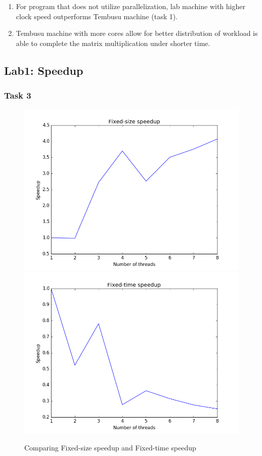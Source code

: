 \documentclass[12pt]{article}
\begin{document}
  \begin{enumerate}
    \item For program that does not utilize parallelization, lab machine
      with higher clock speed outperforms Tembusu machine (task 1).
    \item Tembusu machine with more cores allow for better distribution
      of workload is able to complete the matrix multiplication under
      shorter time.
  \end{enumerate}

\subsection*{Lab1: Speedup}

  \subsubsection*{Task 3}
    \begin{figure}[ht]
      \centering
      \includegraphics[width=0.45\linewidth]{lab1_task3_fixedsize}\hfill
      \includegraphics[width=0.45\linewidth]{lab1_task3_fixedtime}
      \caption{Comparing Fixed-size speedup and Fixed-time speedup}
      \label{fig:task3_speedup}
    \end{figure}
    \newpage
\end{document}

